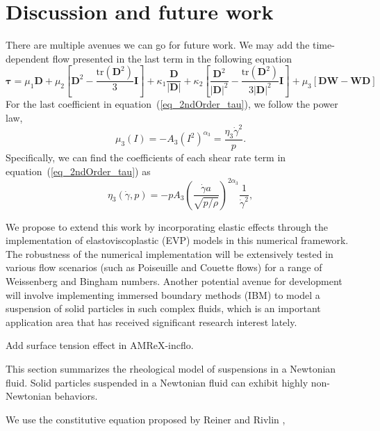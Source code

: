 \section{Discussion and future work}
There are multiple avenues we can go for future work.  
We may add the time-dependent flow presented in the last term in the following equation
\begin{equation}
  \bm{\tau} =  \mu_1 {\bm D} 
    + \mu_2  \left[ {\bm D}^2  - \frac{\text{tr}\left({\bm D}^2\right)}{3}{\bm I} \right]
   + \kappa_1 \frac{{\bm D}}{|{\bm D}|} 
    + \kappa_2  \left[ \frac{{\bm D}^2}{|{\bm D}|^2}  
    - \frac{\text{tr}\left({\bm D}^2\right)}{3|{\bm D}|^2}{\bm I} \right]
    + \mu_3  \left[ {\bm D}{\bm W} - {\bm W}{\bm D} \right]
  \end{equation}
  For the last coefficient in equation~(\ref{eq_2ndOrder_tau}), we follow the power law, 
\begin{equation}
    \mu_3(I) = -A_3 \left( I^2 \right)^{\alpha_3} = \frac{\eta_3 \dot{\gamma}^2}{p}.
\label{eq_muI3}
\end{equation}
Specifically, we can find the coefficients of each shear rate term in equation~(\ref{eq_2ndOrder_tau}) as
\begin{equation}
     \eta_3 (\dot{\gamma}, p) = 
    -p A_3 
        \left( \frac{\dot{\gamma} a }{\sqrt{p/\rho}}  \right)^{2\alpha_3} 
        \frac{1}{\dot{\gamma}^2},
\label{eq_gr_eta_3}
\end{equation}
\par
We propose to extend this work by incorporating elastic effects through the implementation of elastoviscoplastic (EVP) models in this numerical framework. The robustness of the numerical implementation will be extensively tested in various flow scenarios (such as Poiseuille and Couette flows) for a range of Weissenberg and Bingham numbers.  Another potential avenue for development will involve implementing immersed boundary methods (IBM) to model a suspension of solid particles in such complex fluids, which is an important application area that has received significant research interest lately. 
\par
Add surface tension effect in AMReX-incflo. 
\par
This section summarizes the rheological model of suspensions in a Newtonian fluid. Solid particles suspended in a Newtonian fluid can exhibit highly non-Newtonian behaviors.  
\par
We use the constitutive equation proposed by Reiner \cite{reiner_mathematical_1945} and Rivlin \cite{rivlin_stress-deformation_1955},  
